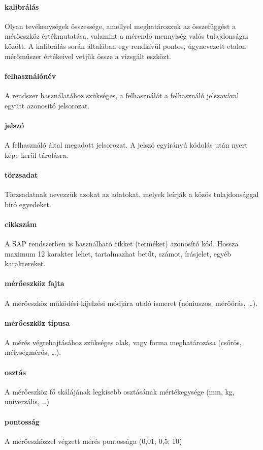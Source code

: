 \paragraph*{kalibrálás} Olyan tevékenységek összessége, amellyel meghatározzuk az
összefüggést a mérőeszköz értékmutatása, valamint a mérendő mennyiség valós
tulajdonságai között. A kalibrálás során általában egy rendkívül pontos, úgynevezett
etalon mérőműszer értékeivel vetjük össze a vizsgált eszközt.
\paragraph*{felhasználónév} A rendszer használatához szükséges, a felhasználót a 
felhasználó jelszavával együtt azonosító jelsorozat.
\paragraph*{jelszó} A felhasználó által megadott jelsorozat. A jelszó egyirányú kódolás
után nyert képe kerül tárolásra.
\paragraph*{törzsadat} Törzsadatnak nevezzük azokat az adatokat, melyek leírják a közös
tulajdonsággal bíró egyedeket.
\paragraph*{cikkszám} A SAP rendszerben is használható cikket (terméket) azonosító
kód. Hossza maximum 12 karakter lehet, tartalmazhat betűt, számot, írásjelet, egyéb 
karaktereket. 
\paragraph*{mérőeszköz fajta} A mérőeszköz működési-kijelzési módjára utaló ismeret
(nóniuszos, mérőórás, \dots).
\paragraph*{mérőeszköz típusa} A mérés végrehajtásához szükséges alak, vagy forma meghatározása (csőrös, mélységmérős, \dots).
\paragraph*{osztás} A mérőeszköz fő skálájának legkisebb osztásának mértékegysége 
(mm, kg, univerzális, \dots)
\paragraph*{pontosság} A mérőeszközzel végzett mérés pontossága (0,01; 0,5; 10)
